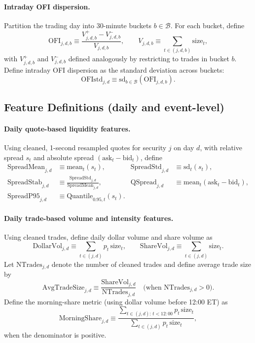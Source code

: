 \paragraph{Intraday OFI dispersion.}
Partition the trading day into 30-minute buckets $b\in\mathcal{B}$.
For each bucket, define
\[
\mathrm{OFI}_{j,d,b} \equiv
\frac{V_{j,d,b}^{+}-V_{j,d,b}^{-}}{V_{j,d,b}},
\qquad
V_{j,d,b} \equiv \sum_{t\in(j,d,b)} \text{size}_t,
\]
with $V_{j,d,b}^{+}$ and $V_{j,d,b}^{-}$ defined analogously by restricting to trades in bucket $b$.
Define intraday OFI dispersion as the standard deviation across buckets:
\begin{equation}
\mathrm{OFIstd}_{j,d} \equiv \mathrm{sd}_{b\in\mathcal{B}}\!\left(\mathrm{OFI}_{j,d,b}\right).
\end{equation}

\subsection{Feature Definitions (daily and event-level)}

\paragraph{Daily quote-based liquidity features.}
Using cleaned, 1-second resampled quotes for security $j$ on day $d$, with relative spread $s_t$ and absolute spread $(\text{ask}_t-\text{bid}_t)$, define
\begin{align}
\mathrm{SpreadMean}_{j,d} &\equiv \mathrm{mean}_t(s_t), &
\mathrm{SpreadStd}_{j,d} &\equiv \mathrm{sd}_t(s_t), \label{eq:spread_mean_std}\\
\mathrm{SpreadStab}_{j,d} &\equiv \frac{\mathrm{SpreadStd}_{j,d}}{\mathrm{SpreadMean}_{j,d}}, &
\mathrm{QSpread}_{j,d} &\equiv \mathrm{mean}_t(\text{ask}_t-\text{bid}_t), \label{eq:spread_stab_qspread}\\
\mathrm{SpreadP95}_{j,d} &\equiv \mathrm{Quantile}_{0.95,t}(s_t). &&
\end{align}

\paragraph{Daily trade-based volume and intensity features.}
Using cleaned trades, define daily dollar volume and share volume as
\begin{equation}
\mathrm{DollarVol}_{j,d} \equiv \sum_{t\in(j,d)} p_t\,\text{size}_t,\qquad
\mathrm{ShareVol}_{j,d} \equiv \sum_{t\in(j,d)} \text{size}_t.
\end{equation}
Let $\mathrm{NTrades}_{j,d}$ denote the number of cleaned trades and define average trade size by
\[
\mathrm{AvgTradeSize}_{j,d} \equiv \frac{\mathrm{ShareVol}_{j,d}}{\mathrm{NTrades}_{j,d}}
\quad \text{(when }\mathrm{NTrades}_{j,d}>0\text{)}.
\]
Define the morning-share metric (using dollar volume before 12{:}00 ET) as
\begin{equation}
\mathrm{MorningShare}_{j,d} \equiv
\frac{\sum_{t\in(j,d):\,t<12{:}00} p_t\,\text{size}_t}{\sum_{t\in(j,d)} p_t\,\text{size}_t},
\end{equation}
when the denominator is positive.

